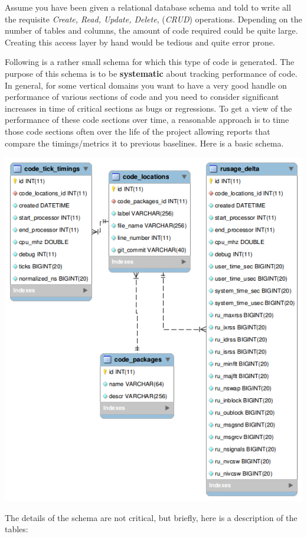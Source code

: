 \documentclass[11pt]{article}
\begin{document}
   Assume you have been given a relational database schema and told to
   write all the requisite \emph{Create, Read, Update, Delete}, (\emph{CRUD})
   operations. Depending on the number of tables and columns, the
   amount of code required could be quite large. Creating this access
   layer by hand would be tedious and quite error prone.

   Following is a rather small schema for which this type of code is
   generated. The purpose of this schema is to be \textbf{systematic} about
   tracking performance of code. In general, for some vertical domains
   you want to have a very good handle on performance of various
   sections of code and you need to consider significant increases in
   time of critical sections as bugs or regressions. To get a view of
   the performance of these code sections over time, a reasonable
   approach is to time those code sections often over the life of the
   project allowing reports that compare the timings/metrics it to
   previous baselines. Here is a basic schema.

\includegraphics[width=.78\textwidth]{./images/code_metrics.png}   


   The details of the schema are not critical, but briefly, here is a
   description of the tables:
\end{document}
